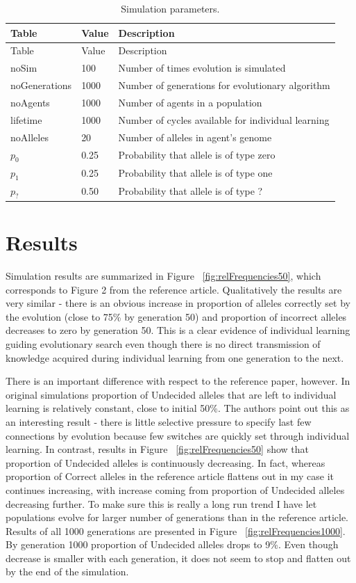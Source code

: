 \documentclass[10pt,a4paper,onecolumn]{article}
\begin{document}
\hypertarget{tbl:parameters}{}
\begin{longtable}[]{@{}lll@{}}
\caption{\label{tbl:parameters}Simulation parameters. }\tabularnewline
\toprule
Table & Value & Description\tabularnewline
\midrule
\endfirsthead
\toprule
Table & Value & Description\tabularnewline
\midrule
\endhead
noSim & 100 & Number of times evolution is simulated\tabularnewline
noGenerations & 1000 & Number of generations for evolutionary
algorithm\tabularnewline
noAgents & 1000 & Number of agents in a population\tabularnewline
lifetime & 1000 & Number of cycles available for individual
learning\tabularnewline
noAlleles & 20 & Number of alleles in agent's genome\tabularnewline
\(p_0\) & 0.25 & Probability that allele is of type zero\tabularnewline
\(p_1\) & 0.25 & Probability that allele is of type one\tabularnewline
\(p_?\) & 0.50 & Probability that allele is of type ?\tabularnewline
\bottomrule
\end{longtable}

\section{Results}\label{results}

Simulation results are summarized in Figure ~\ref{fig:relFrequencies50},
which corresponds to Figure 2 from the reference article. Qualitatively
the results are very similar - there is an obvious increase in
proportion of alleles correctly set by the evolution (close to 75\% by
generation 50) and proportion of incorrect alleles decreases to zero by
generation 50. This is a clear evidence of individual learning guiding
evolutionary search even though there is no direct transmission of
knowledge acquired during individual learning from one generation to the
next.

There is an important difference with respect to the reference paper,
however. In original simulations proportion of Undecided alleles that
are left to individual learning is relatively constant, close to initial
50\%. The authors point out this as an interesting result - there is
little selective pressure to specify last few connections by evolution
because few switches are quickly set through individual learning. In
contrast, results in Figure ~\ref{fig:relFrequencies50} show that
proportion of Undecided alleles is continuously decreasing. In fact,
whereas proportion of Correct alleles in the reference article flattens
out in my case it continues increasing, with increase coming from
proportion of Undecided alleles decreasing further. To make sure this is
really a long run trend I have let populations evolve for larger number
of generations than in the reference article. Results of all 1000
generations are presented in Figure ~\ref{fig:relFrequencies1000}. By
generation 1000 proportion of Undecided alleles drops to 9\%. Even
though decrease is smaller with each generation, it does not seem to
stop and flatten out by the end of the simulation.
\end{document}
